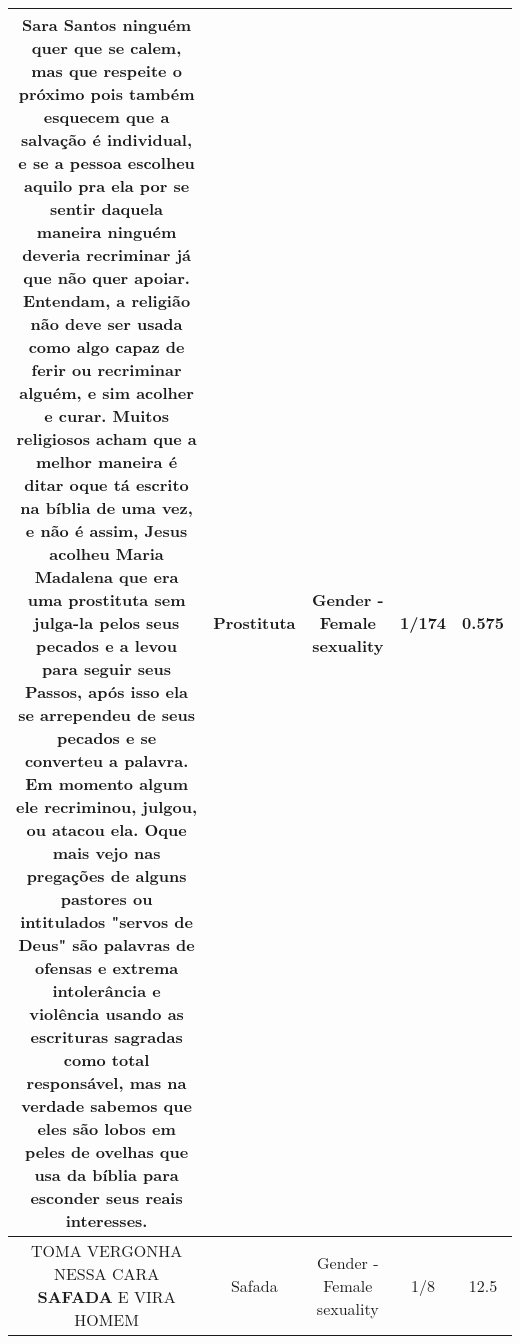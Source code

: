 \documentclass[11pt]{article}
\newlength\mylength
\begin{document}
\begin{center}
\begin{longtable}{|C{.65\mylength}|C{.30\mylength}|C{.12\mylength}|C{.12\mylength}|C{.12\mylength}|}
  \small Sara Santos ninguém quer que se calem, mas que respeite o próximo pois também esquecem que a salvação é individual, e se a pessoa escolheu aquilo pra ela por se sentir daquela maneira ninguém deveria recriminar já que não quer apoiar. Entendam, a religião não deve ser usada como algo capaz de ferir ou recriminar alguém, e sim acolher e curar. Muitos religiosos acham que a melhor maneira é ditar oque tá escrito na bíblia de uma vez, e não é assim, Jesus acolheu Maria Madalena que era uma \textbf{prostituta} sem julga-la pelos seus pecados e a levou para seguir seus Passos, após isso ela se arrependeu de seus pecados e se converteu a palavra. Em momento algum ele recriminou, julgou, ou atacou ela. Oque mais vejo nas pregações de alguns pastores ou intitulados "servos de Deus" são palavras de ofensas e extrema intolerância e violência usando as escrituras sagradas como total responsável, mas na verdade sabemos que eles são lobos em peles de ovelhas que usa da bíblia para esconder seus reais interesses.\normalsize   & Prostituta & Gender - Female sexuality & 1/174 & 0.575 \\  \hline
  \small TOMA VERGONHA NESSA CARA \textbf{SAFADA} E VIRA HOMEM\normalsize   & Safada & Gender - Female sexuality & 1/8 & 12.5 \\  \hline

\end{longtable}
\end{center}
\end{document}
